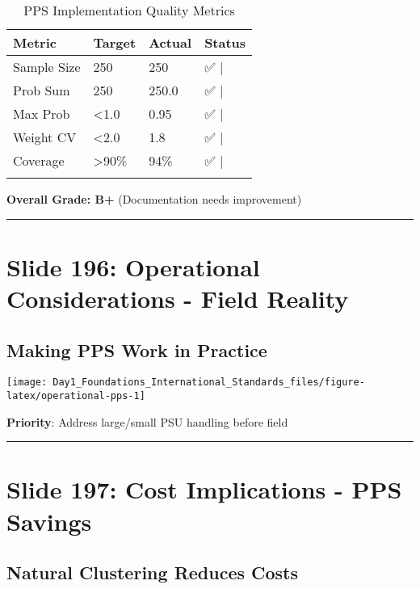 \documentclass[
]{article}
\begin{document}
\begin{longtable}[t]{llll}
\caption{\label{tab:pps-dashboard}PPS Implementation Quality Metrics}\\
\toprule
Metric & Target & Actual & Status\\
\midrule
Sample Size & 250 & 250 & ✅     |\\
Prob Sum & 250 & 250.0 & ✅     |\\
Max Prob & <1.0 & 0.95 & ✅     |\\
Weight CV & <2.0 & 1.8 & ✅     |\\
Coverage & >90\% & 94\% & ✅     |\\
\addlinespace
\cellcolor[HTML]{fff3cd}{Documentation} & \cellcolor[HTML]{fff3cd}{Complete} & \cellcolor[HTML]{fff3cd}{60\%} & \cellcolor[HTML]{fff3cd}{⚠️}\\
\bottomrule
\end{longtable}

\textbf{Overall Grade: B+} (Documentation needs improvement)

\begin{center}\rule{0.5\linewidth}{0.5pt}\end{center}

\section{Slide 196: Operational Considerations - Field
Reality}\label{slide-196-operational-considerations---field-reality}

\subsection{Making PPS Work in
Practice}\label{making-pps-work-in-practice}

\texttt{[image: Day1\_Foundations\_International\_Standards\_files/figure-latex/operational-pps-1]}

\textbf{Priority}: Address large/small PSU handling before field

\begin{center}\rule{0.5\linewidth}{0.5pt}\end{center}

\section{Slide 197: Cost Implications - PPS
Savings}\label{slide-197-cost-implications---pps-savings}

\subsection{Natural Clustering Reduces
Costs}\label{natural-clustering-reduces-costs}
\end{document}
